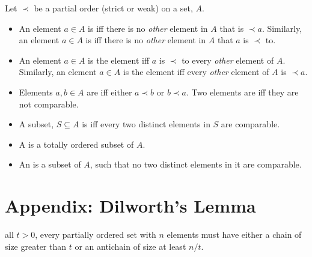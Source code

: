 \documentclass[handout]{mcs}
\begin{document}
Let $\prec$ be a partial order (strict or weak) on a set, $A$.
\begin{itemize}

\item An element $a \in A$ is  iff there is no \emph{other}
  element in $A$ that is $\prec a$.  Similarly, an element $a \in A$ is
   iff there is no \emph{other} element in $A$ that $a$ is
  $\prec$ to.

\item An element $a \in A$ is the  element iff $a$ is
  $\prec$ to every \emph{other} element of $A$.  Similarly, an element $a
  \in A$ is the  element iff every \emph{other} element of
  $A$ is $\prec a$.

\item Elements $a,b \in A$ are  iff either $a \prec b$ or
  $b \prec a$.  Two elements are  iff they are not
  comparable.

\item A subset, $S \subseteq A$ is  iff every
two distinct elements in $S$ are comparable.

\item A  is a totally ordered subset of $A$.  

\item An  is a subset of $A$, such that no two distinct
  elements in it are comparable.

\iffalse
\item An element $a \in A$ is the \term{greatest lower bound (glb)} of a
subset, $S \subseteq A$ iff $a$ is a lower bound for $S$, and if $b \in A$
is also a lower bound for $S$, then $b \preceq a$.  Similarly for
\term{least upper bound (lub)}.
\fi

\iffalse
\item The partial order, $\prec$, is \term{well-founded} iff every
  nonempty subset of $A$ has at least one minimal element.
\fi

\end{itemize}

\section*{Appendix: Dilworth's Lemma}

 all $t>0$, every partially ordered set with
$n$ elements must have either a chain of size greater than $t$ or an
antichain of size at least $n / t$.
\end{document}
